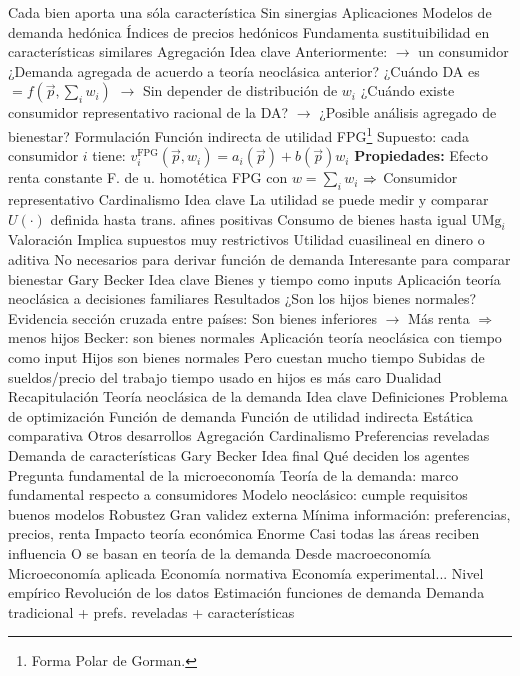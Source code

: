 \documentclass{nuevotema}
\begin{document}
\begin{esquemal}
				\4[$\to$] Cada bien aporta una sóla característica
				\4[$\to$] Sin sinergias
			\3 Aplicaciones
				\4 Modelos de demanda hedónica
				\4 Índices de precios hedónicos
				\4 Fundamenta sustituibilidad en características similares
		\2 Agregación
			\3 Idea clave
				\4 Anteriormente:
				\4[] $\to$ un consumidor
				\4 ¿Demanda agregada de acuerdo a teoría neoclásica anterior?
				\4 ¿Cuándo DA es $=f\left( \vec{p}, \sum_i w_i \right)$
				\4[] $\to$ Sin depender de distribución de $w_i$
				\4 ¿Cuándo existe consumidor representativo racional de la DA?
				\4[] $\to$ ¿Posible análisis agregado de bienestar?
			\3 Formulación
				\4 Función indirecta de utilidad FPG\footnote{Forma Polar de Gorman.}
				\4 Supuesto: cada consumidor $i$ tiene:
				\4[] $v_i^{\text{FPG}}(\vec{p},w_i) = a_i(\vec{p}) + b(\vec{p}) w_i$
				\4 \textbf{Propiedades:}
				\4[(i)] Efecto renta constante
				\4[(ii)] F. de u. homotética
				\4[(iii)] FPG con $w= \sum_i w_i$
				\4[] $\Rightarrow$ Consumidor representativo
		\2 Cardinalismo
			\3 Idea clave
				\4 La utilidad se puede medir y comparar
				\4[$\Rightarrow$] $U(\cdot)$ definida hasta trans. afines positivas
				\4 Consumo de bienes hasta igual $\text{UMg}_i$
			\3 Valoración
				\4 Implica supuestos muy restrictivos
				\4 Utilidad cuasilineal en dinero o aditiva
				\4 No necesarios para derivar función de demanda
				\4 Interesante para comparar bienestar
		\2 Gary Becker
			\3 Idea clave
				\4 Bienes y tiempo como inputs
				\4 Aplicación teoría neoclásica a decisiones familiares
			\3 Resultados
				\4 ¿Son los hijos bienes normales?
				\4 Evidencia sección cruzada entre países:
				\4[] Son bienes inferiores $\to$ Más renta $\Rightarrow$ menos hijos
				\4 Becker: son bienes normales
				\4[] Aplicación teoría neoclásica con tiempo como input
				\4[] Hijos son bienes normales
				\4[] Pero cuestan mucho tiempo
				\4[] Subidas de sueldos/precio del trabajo
				\4[$\Rightarrow$] tiempo usado en hijos es más caro
		\2 Dualidad
	\1[] 
		\2 Recapitulación
			\3 Teoría neoclásica de la demanda
				\4 Idea clave
				\4 Definiciones
				\4 Problema de optimización
				\4 Función de demanda
				\4 Función de utilidad indirecta
				\4 Estática comparativa
			\3  Otros desarrollos
				\4 Agregación
				\4 Cardinalismo
				\4 Preferencias reveladas
				\4 Demanda de características
				\4 Gary Becker
		\2 Idea final
			\3 Qué deciden los agentes
				\4 Pregunta fundamental de la microeconomía
				\4 Teoría de la demanda: marco fundamental respecto a consumidores
				\4 Modelo neoclásico: cumple requisitos buenos modelos
				\4[$\to$] Robustez
				\4[$\to$] Gran validez externa
				\4[$\to$] Mínima información: preferencias, precios, renta
			\3 Impacto teoría económica
				\4 Enorme
				\4[$\to$] Casi todas las áreas reciben influencia
				\4[$\to$] O se basan en teoría de la demanda
				\4[] Desde macroeconomía
				\4[] Microeconomía aplicada
				\4[] Economía normativa
				\4[] Economía experimental...
			\3 Nivel empírico
				\4 Revolución de los datos
				\4 Estimación funciones de demanda
				\4 Demanda tradicional + prefs. reveladas + características
\end{esquemal}
\end{document}
